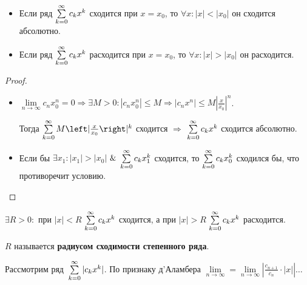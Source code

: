 \begin{theorem}[Абеля]
\begin{itemize}
	\item Если ряд $\series[0] c_k x^k$ сходится при $x = x_0$, то $\forall x \colon |x| < |x_0|$ он сходится абсолютно.
	\item Если ряд $\series[0] c_k x^k$ расходится при $x = x_0$, то $\forall x \colon |x| > |x_0|$ он расходится.
\end{itemize}
\end{theorem}
\begin{proof}
\begin{itemize}
	\item $\lim\limits_{n \to \infty} c_n x_0^n = 0 \Rightarrow
	\exists M > 0 \colon |c_n x_0^n| \leqslant M \Rightarrow
	|c_n x^n| \leqslant M \left| \frac{x}{x_0} \right|^n$.
	
	Тогда $\series[0] M \left| \frac{x}{x_0} \right|^k$ сходится $\Rightarrow$ $\series[0] c_k x^k$ сходится абсолютно.
	
	\item Если бы $\exists x_1 \colon |x_1| > |x_0|$ $\mathrel{\&}$ $\series[0] c_k x_1^k$ сходится, то $\series[0] c_k x_0^k$ сходился бы, что противоречит условию.
\end{itemize}
\end{proof}

\begin{consequent}
$\exists R > 0 \colon$ при $|x| < R$ $\series[0] c_k x^k$ сходится, а при $|x| > R$ $\series[0] c_k x^k$ расходится.
\end{consequent}

$R$ называется \textbf{радиусом сходимости степенного ряда}.

Рассмотрим ряд~$\series[0] |c_k x^k|$.
По признаку д'Аламбера $\lim\limits_{n \to \infty} = \lim\limits_{n \to \infty} \left| \frac{c_{n+1}}{c_n} \cdot |x| \right| \ldots$